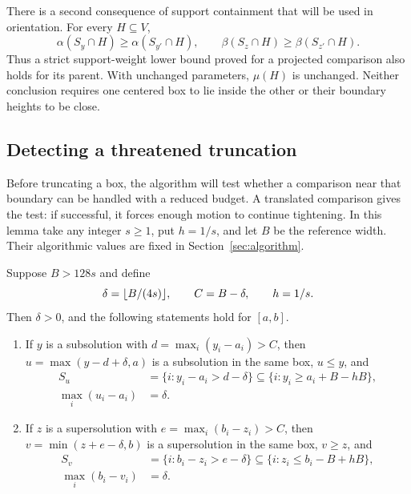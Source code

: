 There is a second consequence of support containment that will be used
in orientation. For every $H\subseteq V$,
\[
 \alpha(S_y\cap H)\ge\alpha(S_{y'}\cap H),\qquad
 \beta(S_z\cap H)\ge\beta(S_{z'}\cap H).
\]
Thus a strict support-weight lower bound proved for a projected
comparison also holds for its parent. With unchanged parameters,
$\mu(H)$ is unchanged. Neither conclusion requires one centered box
to lie inside the other or their boundary heights to be close.

\subsection{Detecting a threatened truncation}

Before truncating a box, the algorithm will test whether a comparison
near that boundary can be handled with a reduced budget. A translated
comparison gives the test: if successful, it forces enough motion to
continue tightening. In this lemma take any integer $s\ge1$, put $h=1/s$,
and let $B$ be the reference width. Their algorithmic values are fixed in
Section~\ref{sec:algorithm}.

\begin{lemma}\label{lem:tightening-projection}
Suppose $B>128s$ and define
\[
 \delta=\lfloor B/(4s)\rfloor,\qquad C=B-\delta,\qquad h=1/s.
\]
Then $\delta>0$, and the following statements hold for $[a,b]$.
\begin{enumerate}[label=\textup{(\roman*)}]
\item If $y$ is a subsolution with $d=\max_i(y_i-a_i)>C$, then
$u=\max(y-d+\delta,a)$ is a subsolution in the same box, $u\le y$, and
\begin{align*}
 S_u&=\{i:y_i-a_i>d-\delta\}
       \subseteq\{i:y_i\ge a_i+B-hB\},\\
 \max_i(u_i-a_i)&=\delta.
\end{align*}
\item If $z$ is a supersolution with $e=\max_i(b_i-z_i)>C$, then
$v=\min(z+e-\delta,b)$ is a supersolution in the same box, $v\ge z$, and
\begin{align*}
 S_v&=\{i:b_i-z_i>e-\delta\}
       \subseteq\{i:z_i\le b_i-B+hB\},\\
 \max_i(b_i-v_i)&=\delta.
\end{align*}
\end{enumerate}
\end{lemma}

